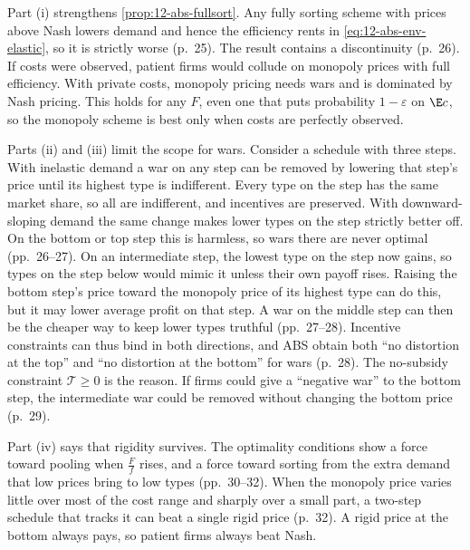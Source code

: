 Part (i) strengthens \cref{prop:12-abs-fullsort}. Any fully sorting scheme with prices above Nash lowers demand and
hence the efficiency rents in \eqref{eq:12-abs-env-elastic}, so it is strictly worse (p.~25). The result contains a
discontinuity (p.~26). If costs were observed, patient firms would collude on monopoly prices with full efficiency.
With private costs, monopoly pricing needs wars and is dominated by Nash pricing. This holds for any $F$, even one
that puts probability $1 - \varepsilon$ on $\E c$, so the monopoly scheme is best only when costs are perfectly
observed.

Parts (ii) and (iii) limit the scope for wars. Consider a schedule with three steps. With inelastic demand a war on
any step can be removed by lowering that step's price until its highest type is indifferent. Every type on the step
has the same market share, so all are indifferent, and incentives are preserved. With downward-sloping demand the
same change makes lower types on the step strictly better off. On the bottom or top step this is harmless, so wars
there are never optimal (pp.~26--27). On an intermediate step, the lowest type on the step now gains, so types on the
step below would mimic it unless their own payoff rises. Raising the bottom step's price toward the monopoly price of
its highest type can do this, but it may lower average profit on that step. A war on the middle step can then be the
cheaper way to keep lower types truthful (pp.~27--28). Incentive constraints can thus bind in both directions, and
ABS obtain both ``no distortion at the top'' and ``no distortion at the bottom'' for wars (p.~28). The no-subsidy
constraint $\mathcal T \ge 0$ is the reason. If firms could give a ``negative war'' to the bottom step, the
intermediate war could be removed without changing the bottom price (p.~29).

Part (iv) says that rigidity survives. The optimality conditions show a force toward pooling when $\frac{F}{f}$ rises,
and a force toward sorting from the extra demand that low prices bring to low types (pp.~30--32). When the monopoly
price varies little over most of the cost range and sharply over a small part, a two-step schedule that tracks it can
beat a single rigid price (p.~32). A rigid price at the bottom always pays, so patient firms always beat Nash.

